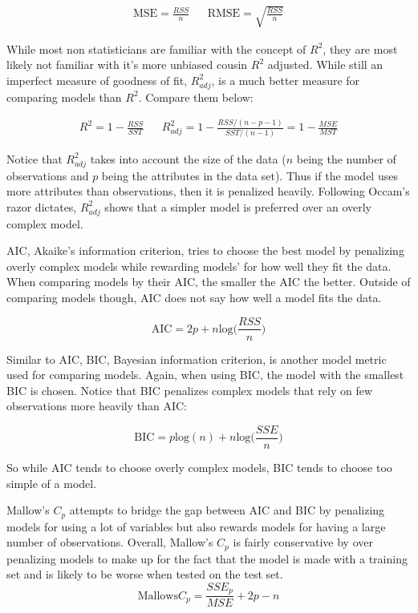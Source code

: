 \documentclass[a4paper]{article}
\begin{document}
\begin{align*}\text{MSE}=\frac{RSS}{n} && \text{RMSE}=\sqrt{\frac{RSS}{n}} \end{align*}

    While most non statisticians are familiar with the concept of $R^2$, they are most likely not familiar with it's more unbiased cousin $R^2$ adjusted. While still an imperfect measure of goodness of fit, $R^2_{adj}$, is a much better measure for comparing models than $R^2$. Compare them below:
  
  \begin{align*}
  R^2 = 1-\frac{RSS}{SST} && R^2_{adj} = 1-\frac{RSS/(n-p-1)}{SST/(n-1)}=1-\frac{MSE}{MST}
\end{align*}
  
  Notice that $R^2_{adj}$ takes into account the size of the data ($n$ being the number of observations and $p$ being the attributes in the data set). Thus if the model uses more attributes than observations, then it is penalized heavily. Following Occam's razor dictates, $R^2_{adj}$ shows that a simpler model is preferred over an overly complex model.
  
  AIC, Akaike's information criterion, tries to choose the best model by penalizing overly complex models while rewarding models' for how well they fit the data. When comparing models by their AIC, the smaller the AIC the better. Outside of comparing models though, AIC does not say how well a model fits the data.
  
  $$\text{AIC} = 2p+n\text{log}\Big(\frac{RSS}{n}\Big)$$
  
  Similar to AIC, BIC, Bayesian information criterion, is another model metric used for comparing models. Again, when using BIC, the model with the smallest BIC is chosen. Notice that BIC penalizes complex models that rely on few observations more heavily than AIC:
  
  $$\text{BIC} = p\text{log}(n)+n\text{log}\Big(\frac{SSE}{n}\Big)$$

So while AIC tends to choose overly complex models, BIC tends to choose too simple of a model.

Mallow's $C_p$ attempts to bridge the gap between AIC and BIC by penalizing models for using a lot of variables but also rewards models for having a large number of observations. Overall, Mallow's $C_p$ is fairly conservative by over penalizing models to make up for the fact that the model is made with a training set and is likely to be worse when tested on the test set.
  $$\text{Mallows} C_p = \frac{SSE_p}{MSE} +2p-n$$
\end{document}
